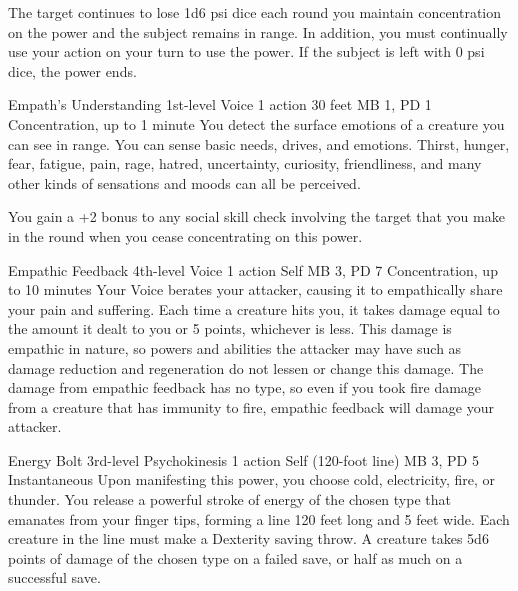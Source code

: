 The target continues to lose 1d6 psi dice each round you
maintain concentration on the power and the subject remains
in range.
In addition, you must continually use your action on your turn
to use the power.
If the subject is left with 0 psi dice, the power ends.

\DndPowerHeader%
  {Empath's Understanding}
  {1st-level Voice}
  {1 action}
  {30 feet}
  {MB 1, PD 1}
  {Concentration, up to 1 minute}
You detect the surface emotions of a creature you can see in range.
You can sense basic needs, drives, and emotions.
Thirst, hunger, fear, fatigue, pain, rage, hatred, uncertainty,
curiosity, friendliness, and many other kinds of sensations and moods
can all be perceived.

You gain a +2 bonus to any social skill check involving the target
that you make in the round when you cease concentrating on this power.

\DndPowerHeader%
  {Empathic Feedback}
  {4th-level Voice}
  {1 action}
  {Self}
  {MB 3, PD 7}
  {Concentration, up to 10 minutes}
Your Voice berates your attacker,
causing it to empathically share your pain and suffering.
Each time a creature hits you,
it takes damage equal to the amount it dealt to you or 5 points,
whichever is less.
This damage is empathic in nature,
so powers and abilities the attacker may have such as damage reduction
and regeneration do not lessen or change this damage.
The damage from empathic feedback has no type,
so even if you took fire damage from a creature
that has immunity to fire,
empathic feedback will damage your attacker.

\DndPowerHeader%
  {Energy Bolt}
  {3rd-level Psychokinesis}
  {1 action}
  {Self (120-foot line)}
  {MB 3, PD 5}
  {Instantaneous}
  Upon manifesting this power, you choose cold, electricity,
  fire, or thunder.
  You release a powerful stroke of energy of the chosen type
  that emanates from your finger tips,
  forming a line 120 feet long and 5 feet wide.
  Each creature in the line must make a Dexterity saving throw.
  A creature takes 5d6 points of damage of the chosen type
  on a failed save,
  or half as much on a successful save.
  
